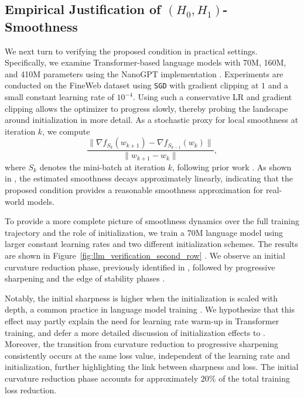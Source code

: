 \documentclass[a4paper,11pt]{article}
\newcommand{\algname}[1]{\texttt{#1}}
\newcommand{\1}{\mathbbm{1}}
\theoremstyle{plain}
\begin{document}
\subsection{Empirical Justification of $(H_0,H_1)$-Smoothness}\label{sec:empirical_justification}


We next turn to verifying the proposed condition in practical settings. Specifically, we examine Transformer-based language models with 70M, 160M, and 410M parameters using the NanoGPT implementation \citep{radford2019language, karpathy2022nanogpt}. Experiments are conducted on the FineWeb dataset \citep{penedo2024fineweb} using \algname{SGD} with gradient clipping at $1$ and a small constant learning rate of $10^{-4}$. Using such a conservative LR and gradient clipping allows the optimizer to progress slowly, thereby probing the landscape around initialization in more detail. As a stochastic proxy for local smoothness at iteration $k$, we compute $$\frac{\|\nabla f_{S_k}(w_{k+1})-\nabla f_{S_{k-1}}(w_k)\|}{\|w_{k+1} -w_k\|},$$ where $S_k$ denotes the mini-batch at iteration $k$, following prior work \citep{zhang2019gradient, riabinin2025gluon}. As shown in , the estimated smoothness decays approximately linearly, indicating that the proposed condition provides a reasonable smoothness approximation for real-world models. 


To provide a more complete picture of smoothness dynamics over the full training trajectory and the role of initialization, we train a 70M language model using larger constant learning rates and two different initialization schemes. The results are shown in Figure~\ref{fig:llm_verification_second_row} . We observe an initial curvature reduction phase, previously identified in \citep{kalra2024warmup,kalra2023universal}, followed by progressive sharpening and the edge of stability phases \citep{cohen2021gradient}. 

Notably, the initial sharpness is higher when the initialization is scaled with depth, a common practice in language model training \citep{sun2025curse,zhang2019improving}. We hypothesize that this effect may partly explain the need for learning rate warm-up in Transformer training, and defer a more detailed discussion of initialization effects to . Moreover, the transition from curvature reduction to progressive sharpening consistently occurs at the same loss value, independent of the learning rate and initialization, further highlighting the link between sharpness and loss. The initial curvature reduction phase accounts for approximately $20\%$ of the total training loss reduction.
\end{document}
